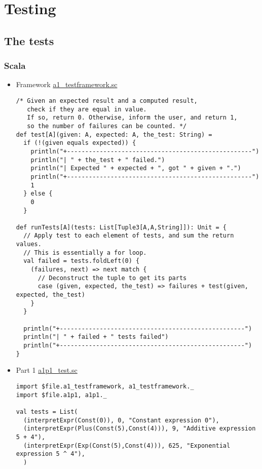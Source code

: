 \documentclass[11pt]{article}
\begin{document}
\section*{Testing}
\label{sec:orgc9f5046}
\subsection*{The tests}
\label{sec:orgc225927}
\subsubsection*{Scala}
\label{sec:org8e44558}
\begin{itemize}
\item Framework
\label{sec:orgd43d99f}
\href{./testing/a1/a1\_testframework.sc}{a1\_testframework.sc}
\begin{verbatim}
/* Given an expected result and a computed result,
   check if they are equal in value.
   If so, return 0. Otherwise, inform the user, and return 1,
   so the number of failures can be counted. */
def test[A](given: A, expected: A, the_test: String) =
  if (!(given equals expected)) {
    println("+---------------------------------------------------")
    println("| " + the_test + " failed.")
    println("| Expected " + expected + ", got " + given + ".")
    println("+---------------------------------------------------")
    1
  } else {
    0
  }

def runTests[A](tests: List[Tuple3[A,A,String]]): Unit = {
  // Apply test to each element of tests, and sum the return values.
  // This is essentially a for loop.
  val failed = tests.foldLeft(0) {
    (failures, next) => next match {
      // Deconstruct the tuple to get its parts
      case (given, expected, the_test) => failures + test(given, expected, the_test)
    }
  }
  
  println("+---------------------------------------------------")
  println("| " + failed + " tests failed")
  println("+---------------------------------------------------")
}
\end{verbatim}

\item Part 1
\label{sec:org6dff61a}
\href{./testing/a1/a1p1\_test.sc}{a1p1\_test.sc}
\begin{verbatim}
import $file.a1_testframework, a1_testframework._
import $file.a1p1, a1p1._

val tests = List(
  (interpretExpr(Const(0)), 0, "Constant expression 0"),
  (interpretExpr(Plus(Const(5),Const(4))), 9, "Additive expression 5 + 4"),
  (interpretExpr(Exp(Const(5),Const(4))), 625, "Exponential expression 5 ^ 4"),
  )


\end{verbatim}
\end{itemize}
\end{document}
